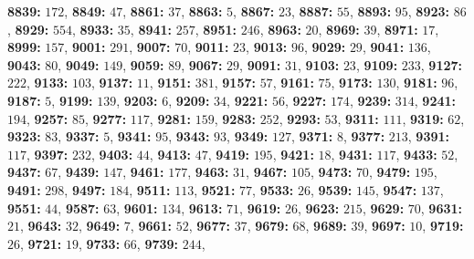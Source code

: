 \textsf{\bfseries 8839:} $172$, \textsf{\bfseries 8849:} $47$, \textsf{\bfseries 8861:} $37$, \textsf{\bfseries 8863:} $5$, \textsf{\bfseries 8867:} $23$, \textsf{\bfseries 8887:} $55$, \textsf{\bfseries 8893:} $95$, \textsf{\bfseries 8923:} $86$, \textsf{\bfseries 8929:} $554$, \textsf{\bfseries 8933:} $35$, \textsf{\bfseries 8941:} $257$, \textsf{\bfseries 8951:} $246$, \textsf{\bfseries 8963:} $20$, \textsf{\bfseries 8969:} $39$, \textsf{\bfseries 8971:} $17$, \textsf{\bfseries 8999:} $157$, \textsf{\bfseries 9001:} $291$, \textsf{\bfseries 9007:} $70$, \textsf{\bfseries 9011:} $23$, \textsf{\bfseries 9013:} $96$, \textsf{\bfseries 9029:} $29$, \textsf{\bfseries 9041:} $136$, \textsf{\bfseries 9043:} $80$, \textsf{\bfseries 9049:} $149$, \textsf{\bfseries 9059:} $89$, \textsf{\bfseries 9067:} $29$, \textsf{\bfseries 9091:} $31$, \textsf{\bfseries 9103:} $23$, \textsf{\bfseries 9109:} $233$, \textsf{\bfseries 9127:} $222$, \textsf{\bfseries 9133:} $103$, \textsf{\bfseries 9137:} $11$, \textsf{\bfseries 9151:} $381$, \textsf{\bfseries 9157:} $57$, \textsf{\bfseries 9161:} $75$, \textsf{\bfseries 9173:} $130$, \textsf{\bfseries 9181:} $96$, \textsf{\bfseries 9187:} $5$, \textsf{\bfseries 9199:} $139$, \textsf{\bfseries 9203:} $6$, \textsf{\bfseries 9209:} $34$, \textsf{\bfseries 9221:} $56$, \textsf{\bfseries 9227:} $174$, \textsf{\bfseries 9239:} $314$, \textsf{\bfseries 9241:} $194$, \textsf{\bfseries 9257:} $85$, \textsf{\bfseries 9277:} $117$, \textsf{\bfseries 9281:} $159$, \textsf{\bfseries 9283:} $252$, \textsf{\bfseries 9293:} $53$, \textsf{\bfseries 9311:} $111$, \textsf{\bfseries 9319:} $62$, \textsf{\bfseries 9323:} $83$, \textsf{\bfseries 9337:} $5$, \textsf{\bfseries 9341:} $95$, \textsf{\bfseries 9343:} $93$, \textsf{\bfseries 9349:} $127$, \textsf{\bfseries 9371:} $8$, \textsf{\bfseries 9377:} $213$, \textsf{\bfseries 9391:} $117$, \textsf{\bfseries 9397:} $232$, \textsf{\bfseries 9403:} $44$, \textsf{\bfseries 9413:} $47$, \textsf{\bfseries 9419:} $195$, \textsf{\bfseries 9421:} $18$, \textsf{\bfseries 9431:} $117$, \textsf{\bfseries 9433:} $52$, \textsf{\bfseries 9437:} $67$, \textsf{\bfseries 9439:} $147$, \textsf{\bfseries 9461:} $177$, \textsf{\bfseries 9463:} $31$, \textsf{\bfseries 9467:} $105$, \textsf{\bfseries 9473:} $70$, \textsf{\bfseries 9479:} $195$, \textsf{\bfseries 9491:} $298$, \textsf{\bfseries 9497:} $184$, \textsf{\bfseries 9511:} $113$, \textsf{\bfseries 9521:} $77$, \textsf{\bfseries 9533:} $26$, \textsf{\bfseries 9539:} $145$, \textsf{\bfseries 9547:} $137$, \textsf{\bfseries 9551:} $44$, \textsf{\bfseries 9587:} $63$, \textsf{\bfseries 9601:} $134$, \textsf{\bfseries 9613:} $71$, \textsf{\bfseries 9619:} $26$, \textsf{\bfseries 9623:} $215$, \textsf{\bfseries 9629:} $70$, \textsf{\bfseries 9631:} $21$, \textsf{\bfseries 9643:} $32$, \textsf{\bfseries 9649:} $7$, \textsf{\bfseries 9661:} $52$, \textsf{\bfseries 9677:} $37$, \textsf{\bfseries 9679:} $68$, \textsf{\bfseries 9689:} $39$, \textsf{\bfseries 9697:} $10$, \textsf{\bfseries 9719:} $26$, \textsf{\bfseries 9721:} $19$, \textsf{\bfseries 9733:} $66$, \textsf{\bfseries 9739:} $244$, 
